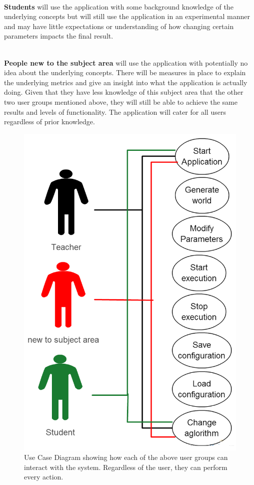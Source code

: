 \noindent \\
\textbf{Students} will use the application with some background knowledge of the underlying concepts but will still use the application in an experimental manner and may have little expectations or understanding of how changing certain parameters impacts the final result. 

\noindent \\
\textbf{People new to the subject area} will use the application with potentially no idea about the underlying concepts. There will be measures in place to explain the underlying metrics and give an insight into what the application is actually doing. Given that they have less knowledge of this subject area that the other two user groups mentioned above, they will still be able to achieve the same results and levels of functionality. The application will cater for all users regardless of prior knowledge.

\begin{figure}[H]
\centering
\includegraphics[scale=0.4]{Images/requirements/useCase}
\caption[Use Case Diagram]{Use Case Diagram showing how each of the above user groups can interact with the system. Regardless of the user, they can perform every action.}
\label{fig:useCase}
\end{figure}

